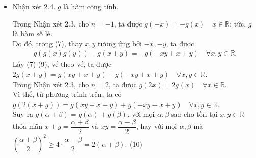 \begin{bt}
{\begin{itemize}
			\begin{cm}
				Nếu $x=0$ thì hệ thức cần chứng minh hiển nhiên đúng.\\
				Xét $x \ne 0$. Khi đó, thế $y=\dfrac{n}{x}$ vào (7), ta được
				$$ g\left(g(x)g\left(\dfrac{n}{x}\right)\right)+g\left(x+\dfrac{n}{x}\right)=g\left(n+x+\dfrac{n}{x}\right)  \quad \forall x \ne 0,  \forall n \in \mathbb{Z}$$
				Do (6), từ hệ thức trên, ta có $g\left(g(x)g\left(\dfrac{n}{x}\right)\right)=n   \quad \forall x \ne 0,  \forall n \in \mathbb{Z}$.\\
				Từ đó, theo Nhận xét 2.2, ta được $g(x) \cdot g\left(\dfrac{n}{x}\right)=n   \quad \forall x \ne 0,  \forall n \in \mathbb{Z}$\\
				hay $g(x)=\dfrac{n}{g(\frac{n}{x})}  \quad \forall x \ne 0,  \forall n \in \mathbb{Z}.$ \hfill (8)\\
				Cho $n=1$, ta được $g(x)=\dfrac{1}{g(1/x)}, \quad x \ne 0$.\\
				Do đó, trong (8), thay $x$ bởi $nx$, ta có $g(nx)=\dfrac{n}{g(1/x)}=n \cdot g(x)  \quad \forall x \ne 0,  \forall n \in \mathbb{Z}.$\\
				Nhận xét 2.3 được chứng minh.
			\end{cm}
			\item Nhận xét 2.4. $g$ là hàm cộng tính.
			\begin{cm}
				Trong Nhận xét 2.3, cho $n=-1$, ta được $g(-x)=-g(x) \quad x \in \mathbb{R}$; tức, $g$ là hàm số lẻ.\\
				Do đó, trong (7), thay $x,y$ tương ứng bởi $-x, -y$, ta được 
				\begin{align*}
					g\left(g(x)g(y)\right)-g(x+y)=-g(-xy+x+y) \quad \forall x,y \in \mathbb{R}. \tag{9}
				\end{align*}
				Lấy (7)-(9), vế theo vế, ta được $2g(x+y)=g(xy+x+y)+g(-xy+x+y) \quad \forall x,y \in \mathbb{R}$.\\
				Trong Nhận xét 2.3, cho $n=2$, ta được $g(2x)=2g(x ) \quad \forall x \in \mathbb{R}$.\\
				Vì thế, từ phương trình trên, ta có $g(2(x+y))=g(xy+x+y)+g(-xy+x+y) \quad \forall x,y \in \mathbb{R}$.\\
				Suy ra $g(\alpha +\beta)=g(\alpha)+g(\beta)$, với mọi $\alpha, \beta$ sao cho tồn tại $x, y \in \mathbb{R}$ thỏa mãn $x+y=\dfrac{\alpha+\beta}{2}$ và $xy=\dfrac{\alpha-\beta}{2}$, hay với mọi $\alpha, \beta$ mà 
				$\left(\dfrac{\alpha+\beta}{2}\right)^2 \ge 4 \cdot \dfrac{\alpha-\beta}{2}=2(\alpha+\beta)$. \hfill (10)\\

\end{cm}
\end{itemize}}
\end{bt}
